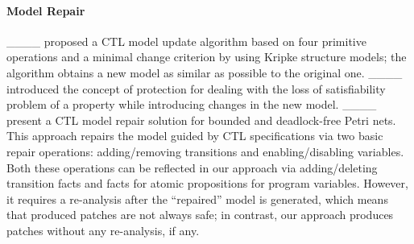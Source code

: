 

\vspace{-1mm}
\noindent\paragraph{\textbf{Model Repair}}




____ proposed a CTL model update algorithm based on four primitive operations and a minimal change criterion by using Kripke structure models; the algorithm obtains a new model as similar as possible to the original one. 
____ introduced the concept of protection for dealing with the loss of satisfiability problem of a property while introducing changes in the new model. 
____ present a CTL model repair solution for bounded and deadlock-free Petri nets. 
This approach repairs the model guided by CTL specifications via two basic repair operations: adding/removing transitions and enabling/disabling variables. Both these operations can be reflected in our approach via adding/deleting transition facts and facts for atomic propositions for program variables. 
However, it requires a re-analysis after the ``repaired'' model is generated, which means that produced patches are not always safe; 
in contrast, our approach produces patches without any re-analysis, if any. 




